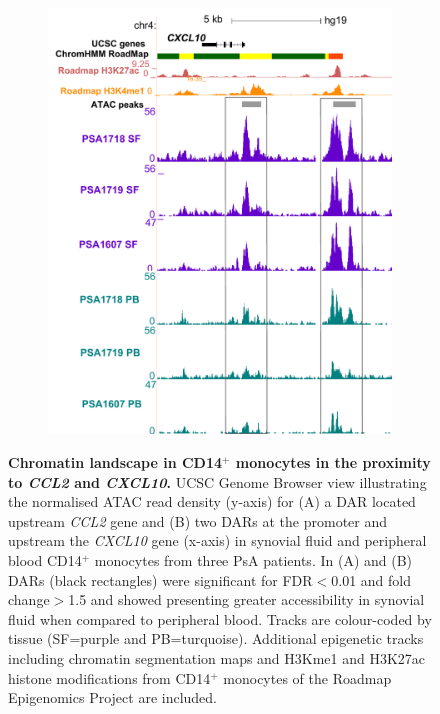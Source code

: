 \begin{figure}[H]
\begin{subfigure}[b]{0.45\textwidth}
\includegraphics[width=\textwidth]{./Results3/pdfs/ATAC_PSA_CD14_UCSC_CXCL10_promoter_and_upstream_5kb_track}%
\caption{}
\end{subfigure}
\caption[Chromatin landscape in CD14$^+$ monocytes in the proximity to \textit{CCL2} and \textit{CXCL10}.]{\textbf{Chromatin landscape in CD14$^+$ monocytes in the proximity to \textit{CCL2} and \textit{CXCL10}.} UCSC Genome Browser view illustrating the normalised ATAC read density (y-axis) for (A) a DAR located upstream \textit{CCL2} gene  and (B) two DARs at the promoter and upstream the \textit{CXCL10} gene (x-axis) in synovial fluid and peripheral blood CD14$^+$ monocytes from three PsA patients. In (A) and (B) DARs (black rectangles) were significant for FDR$<$0.01 and fold change$>$1.5 and showed presenting greater accessibility in synovial fluid when compared to peripheral blood. Tracks are colour-coded by tissue (SF=purple and PB=turquoise). Additional epigenetic tracks including chromatin segmentation maps and H3Kme1 and H3K27ac histone modifications from CD14$^+$ monocytes of the Roadmap Epigenomics Project are included.}
\label{figure:PsA_10X_qPCR_ATAC_CD14_CCL2_CXCL10}
\end{figure}


